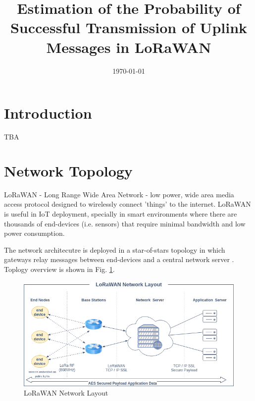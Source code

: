 \documentclass[11pt, a4paper]{article} %
\title{Estimation of the Probability of Successful Transmission of Uplink Messages in LoRaWAN} %
\author{
	\authorstyle{Ante Lojić Kapetanović}
	\newline\newline %
	\institution{University of Split, Split, Croatia}
}
\date{\today} %
\begin{document}
\maketitle %

\thispagestyle{firstpage} %




\section{Introduction}
TBA

\section{Network Topology}

LoRaWAN - Long Range Wide Area Network - low power, wide area media access protocol designed to wirelessly connect 'things' to the internet. LoRaWAN is useful in IoT deployment, specially in smart environments where there are thousands of end-devices (i.e. sensors) that require minimal bandwidth and low power consumption.

The network architecutre is deployed in a star-of-stars topology in which gateways relay messages between end-devices and a central network server \cite{Silva_LoRaWAN}.
Toplogy overview is shown in Fig. \ref{lorawan}.
\begin{figure}
	\includegraphics[width=\linewidth]{images/LoRaWAN-Network-Layout.png} %
	\caption{LoRaWAN Network Layout} %
	\label{lorawan} %
\end{figure}
\end{document}
